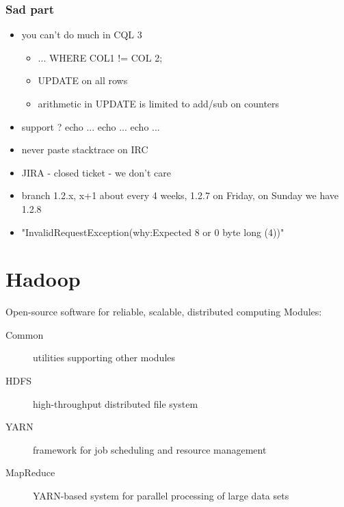 \documentclass{beamer}
\begin{document}
\begin{frame}
    \frametitle{Sad part}
    \begin{itemize}
        \item you can't do much in CQL 3
            \pause
        \begin{itemize}
            \item ... WHERE COL1 != COL 2;
                \pause
            \item UPDATE on all rows
                \pause
            \item arithmetic in UPDATE is limited to add/sub on counters
        \end{itemize}
            \pause
        \item support ? echo ... echo ... echo ...
            \pause
        \item never paste stacktrace on IRC
            \pause
        \item JIRA - closed ticket - we don't care
            \pause
        \item branch 1.2.x, x+1 about every 4 weeks, 1.2.7 on Friday, on Sunday we have 1.2.8
            \pause
        \item "InvalidRequestException(why:Expected 8 or 0 byte long (4))"
    \end{itemize}
\end{frame}


\section{Hadoop}

\begin{frame}
    \begin{block}{Open-source software for reliable, scalable, distributed computing}
        Modules:
        \begin{description}
            \item[Common] utilities supporting other modules
            \item[HDFS] high-throughput distributed file system
            \item[YARN] framework for job scheduling and resource management
            \item[MapReduce] YARN-based system for parallel processing of large data sets
        \end{description}
    \end{block}
\end{frame}
\end{document}
